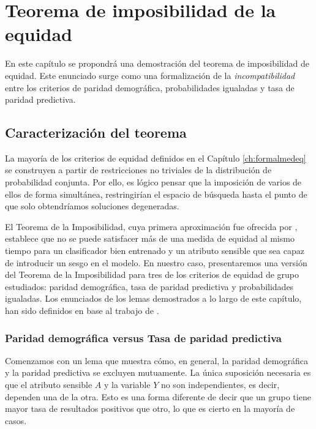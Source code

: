 \documentclass[oneside,openright,titlepage,numbers=noenddot,openany,headinclude,footinclude=true,
cleardoublepage=empty,abstractoff,BCOR=5mm,paper=a4,fontsize=12pt,main=spanish]{scrreprt}
\begin{document}
\chapter{Teorema de imposibilidad de la equidad}

\label{ch:teoremaimposibilidad}

En este capítulo se propondrá una demostración del teorema de imposibilidad de equidad. Este enunciado surge como una formalización de la \textit{incompatibilidad} entre los criterios de paridad demográfica, probabilidades igualadas y tasa de paridad predictiva.

\section{Caracterización del teorema}

La mayoría de los criterios de equidad definidos en el Capítulo \ref{ch:formalmedeq} se construyen a partir de restricciones no triviales de la distribución de probabilidad conjunta. Por ello, es lógico pensar que la imposición de varios de ellos de forma simultánea, restringirían el espacio de búsqueda hasta el punto de que solo obtendríamos soluciones degeneradas.

El Teorema de la Imposibilidad, cuya primera aproximación fue ofrecida por \cite{fairth2016}, establece que no se puede satisfacer más de una medida de equidad al mismo tiempo para un clasificador bien entrenado y un atributo sensible que sea capaz de introducir un sesgo en el modelo. En nuestro caso, presentaremos una versión del Teorema de la Imposibilidad para tres de los criterios de equidad de grupo estudiados: paridad demográfica, tasa de paridad predictiva y probabilidades igualadas. Los enunciados de los lemas demostrados a lo largo de este capítulo, han sido definidos en base al trabajo de \cite{fairnesslearning2019}.


\subsection{Paridad demográfica versus Tasa de paridad predictiva}

Comenzamos con un lema que muestra cómo, en general, la paridad demográfica y la paridad predictiva se excluyen mutuamente. La única suposición necesaria es que el atributo sensible $A$ y la variable $Y$ no son independientes, es decir, dependen una de la otra. Esto es una forma diferente de decir que un grupo tiene mayor tasa de resultados positivos que otro, lo que es cierto en la mayoría de casos.
\end{document}
